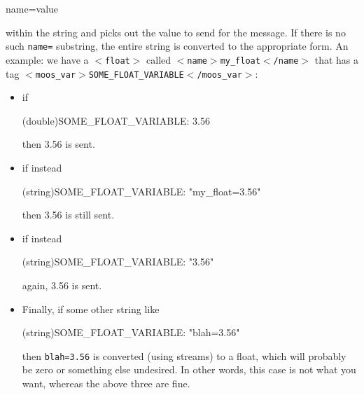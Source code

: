\documentclass[11pt, letterpaper, oneside]{memoir}
\newcommand{\xmltag}[1]{\texttt{$<$#1$>$}}
\begin{document}
\begin{itemize}
\begin{itemize}
\begin{small}
\begin{boxedverbatim}
name=value
\end{boxedverbatim}
\resetbvlinenumber
\end{small}
within the string and picks out the value to send for the message. If there is no such \verb|name=| substring, the entire string is converted to the appropriate form. An example: we have a \xmltag{float} called \xmltag{name$>$my\_float$<$/name} that has a tag \xmltag{moos\_var$>$SOME\_FLOAT\_VARIABLE$<$/moos\_var}: 
\begin{itemize}
\item if
\begin{small}
\begin{boxedverbatim}
(double)SOME_FLOAT_VARIABLE: 3.56
\end{boxedverbatim}
\resetbvlinenumber
\end{small}
then 3.56 is sent.
\item if instead 
\begin{small}
\begin{boxedverbatim}
(string)SOME_FLOAT_VARIABLE: "my_float=3.56"
\end{boxedverbatim}
\resetbvlinenumber
\end{small}
then 3.56 is still sent.
\item if instead
\begin{small}
\begin{boxedverbatim}
(string)SOME_FLOAT_VARIABLE: "3.56"
\end{boxedverbatim}
\resetbvlinenumber
\end{small}
again, 3.56 is sent.
\item Finally, if some other string like
\begin{small}
\begin{boxedverbatim}
(string)SOME_FLOAT_VARIABLE: "blah=3.56"
\end{boxedverbatim}
\resetbvlinenumber
\end{small}
then \verb|blah=3.56| is converted (using streams) to a float, which will probably be zero or something else undesired. In other words, this case is not what you want, whereas the above three are fine.
\end{itemize}
\end{itemize}

\end{itemize}
\end{document}
